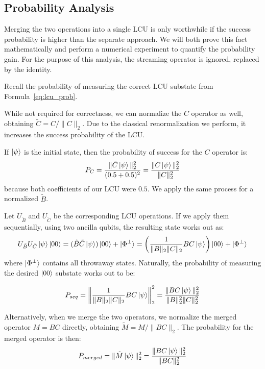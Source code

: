 \subsection{Probability Analysis}

Merging the two operations into a single LCU is only worthwhile if the success probability is higher than the separate approach.
We will both prove this fact mathematically and perform a numerical experiment to quantify the probability gain.
For the purpose of this analysis, the streaming operator is ignored, replaced by the identity.

Recall the probability of measuring the correct LCU substate from Formula~{\ref{eq:lcu_prob}}.

While not required for correctness, we can normalize the $C$ operator as well, obtaining $\tilde{C} = C / \|C\|_2$.
Due to the classical renormalization we perform, it increases the success probability of the LCU.

If $\ket{\psi}$ is the initial state, then the probability of success for the $C$ operator is:
\begin{equation*}
    P_C = \frac{\| \tilde{C} \ket{\psi} \|_2^2}{(0.5 + 0.5)^2} = \frac{\| C \ket{\psi} \|_2^2}{\|C\|_2^2}
\end{equation*}
because both coefficients of our LCU were $0.5$.
We apply the same process for a normalized $\tilde{B}$.

Let $U_{\tilde{B}}$ and $U_{\tilde{C}}$ be the corresponding LCU operations. 
If we apply them sequentially, using two ancilla qubits, the resulting state works out as:
\begin{equation*}
    U_{\tilde{B}} U_{\tilde{C}} \ket{\psi}\ket{00} = (\tilde{B}\tilde{C}\ket{\psi})\ket{00} + \ket{\Phi^\perp} = \left( \frac{1}{\|B\|_2 \|C\|_2} BC \ket{\psi} \right)\ket{00} + \ket{\Phi^\perp}
\end{equation*}
where $\ket{\Phi^\perp}$ contains all throwaway states.
Naturally, the probability of measuring the desired $\ket{00}$ substate works out to be:

\begin{equation*}
    P_{seq} = \left\| \frac{1}{\|B\|_2 \|C\|_2} BC \ket{\psi} \right\|_2^2 = \frac{\| BC \ket{\psi} \|_2^2}{\|B\|_2^2 \|C\|_2^2}
\end{equation*}

Alternatively, when we merge the two operators, we normalize the merged operator $M = BC$ directly, obtaining $\tilde{M} = M / \|BC\|_2$.
The probability for the merged operator is then:
\begin{equation*}
    P_{merged} = \| \tilde{M} \ket{\psi} \|_2^2 = \frac{\| BC \ket{\psi} \|_2^2}{\|BC\|_2^2}
\end{equation*}

